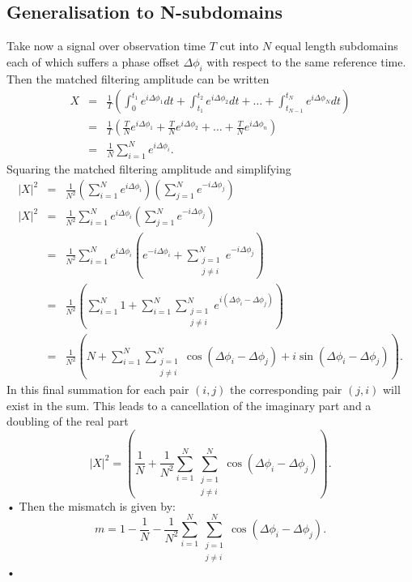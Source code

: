\subsection{Generalisation to N-subdomains}
Take now a signal over observation time $T$ cut into $N$ equal length subdomains
each of which suffers a phase offset $\Delta \phi_{i}$ with respect to the same
reference time. Then the matched filtering amplitude can be written
\begin{eqnarray}
X & = & \frac{1}{T}\left(\int_{0}^{t_{1}}e^{i\Delta\phi_{1}} dt + 
\int_{t_{1}}^{t_{2}}e^{i\Delta\phi_{2}} dt + \dots + 
\int_{t_{N-1}}^{t_{N}}e^{i\Delta\phi_{N}} dt \right) \\
& = &  \frac{1}{T}\left(\frac{T}{N}e^{i\Delta\phi_{1}} + 
\frac{T}{N}e^{i\Delta\phi_{2}} + \dots + \frac{T}{N}e^{i\Delta\phi_{n}} \right)\\
& = & \frac{1}{N} \sum_{i=1}^{N}e^{i\Delta \phi_{i}}.
\end{eqnarray}
Squaring the matched filtering amplitude and simplifying
\begin{eqnarray}
|X|^{2} & = &  \frac{1}{N^{2}} \left(\sum_{i=1}^{N}e^{i\Delta \phi_{i}}\right)\left(\sum_{j=1}^{N}e^{-i\Delta \phi_{j}}\right) \\
|X|^{2} & = &  \frac{1}{N^{2}} \sum_{i=1}^{N}e^{i\Delta \phi_{i}}\left(\sum_{j=1}^{N}e^{-i\Delta \phi_{j}}\right) \\
& = & \frac{1}{N^{2}} \sum_{i=1}^{N}e^{i\Delta \phi_{i}}\left(e^{-i\Delta \phi_{i}} +  \sum_{\substack{j=1 \\j\ne i}}^{N}e^{-i\Delta \phi_{j}}\right) \\
& = & \frac{1}{N^{2}} \left(\sum_{i=1}^{N}1 +   \sum_{i=1}^{N}\sum_{\substack{j=1 \\j\ne i}}^{N}e^{i(\Delta\phi_{i}-\Delta \phi_{j})}\right) \\
& = & \frac{1}{N^{2}} \left(N +   \sum_{i=1}^{N}\sum_{\substack{j=1 \\j\ne i}}^{N}\cos(\Delta\phi_{i} - \Delta\phi_{j}) + i\sin(\Delta\phi_{i} - \Delta\phi_{j})\right).
\end{eqnarray}
In this final summation for each pair $(i,j)$ the corresponding pair $(j, i)$
will exist in the sum. This leads to a cancellation of the imaginary part and a
doubling of the real part
\begin{equation}
|X|^{2}  = \left(\frac{1}{N} + \frac{1}{N^{2}}\sum_{i=1}^{N}\sum_{\substack{j=1 \\j\ne i}}^{N} \cos(\Delta\phi_{i} - \Delta \phi_{j})\right).
\end{equation}•
Then the mismatch is given by:
\begin{equation}
m = 1 - \frac{1}{N} - \frac{1}{N^{2}}\sum_{i=1}^{N}\sum_{\substack{j=1 \\j\ne i}}^{N} \cos(\Delta\phi_{i} - \Delta\phi_{j}).
\label{eqn: phase mismatch}
\end{equation}•
